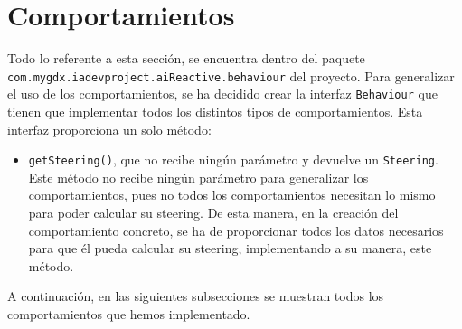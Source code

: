 \medskip
\section{Comportamientos}
Todo lo referente a esta sección, se encuentra dentro del paquete \texttt{com.mygdx.iadevproject.aiReactive.behaviour} del proyecto. Para generalizar el uso de los comportamientos, se ha decidido crear la interfaz \texttt{Behaviour} que tienen que implementar todos los distintos tipos de comportamientos. Esta interfaz proporciona un solo método:
\begin{itemize}
 \item \texttt{getSteering()}, que no recibe ningún parámetro y devuelve un \texttt{Steering}. Este método no recibe ningún parámetro para generalizar los comportamientos, pues no todos los comportamientos necesitan lo mismo para poder calcular su steering. De esta manera, en la creación del comportamiento concreto, se ha de proporcionar todos los datos necesarios para que él pueda calcular su steering, implementando a su manera, este método. 
\end{itemize}

A continuación, en las siguientes subsecciones se muestran todos los comportamientos que hemos implementado.

\medskip
